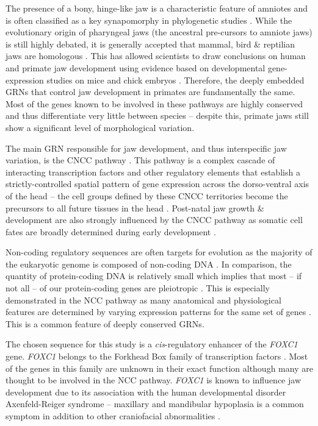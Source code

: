 \documentclass{article}[12pt]
\begin{document}
The presence of a bony, hinge-like jaw is a characteristic feature of amniotes and is often classified as a key synapomorphy in phylogenetic studies \parencite{Franchini2017}. While the evolutionary origin of pharyngeal jaws (the ancestral pre-cursors to amniote jaws) is still highly debated, it is generally accepted that mammal, bird \& reptilian jaws are homologous \parencite{Kulesa2010}. This has allowed scientists to draw conclusions on human and primate jaw development using evidence based on developmental gene-expression studies on mice and chick embryos \parencite{Huang2004, Kulesa2010, Varki2005}. Therefore, the deeply embedded \Glspl{GRN} that control jaw development in primates are fundamentally the same. Most of the genes known to be involved in these pathways are highly conserved and thus differentiate very little between species \parencite{Bird2007} – despite this, primate jaws still show a significant level of morphological variation.

The main \Gls{GRN} responsible for jaw development, and thus interspecific jaw variation, is the \Gls{CNCC} pathway \parencite{McLean2011}. This pathway is a complex cascade of interacting transcription factors and other regulatory elements that establish a strictly-controlled spatial pattern of gene expression across the dorso-ventral axis of the head – the cell groups defined by these \Gls{CNCC} territories become the precursors to all future tissues in the head \parencite{Kulesa2010}. Post-natal jaw growth \& development are also strongly influenced by the \Gls{CNCC} pathway as somatic cell fates are broadly determined during early development \parencite{Bastir2004}.

Non-coding regulatory sequences are often targets for evolution as the majority of the eukaryotic genome is composed of non-coding DNA \parencite{Franchini2017, Kostka2011, McLean2011}. In comparison, the quantity of protein-coding DNA is relatively small which implies that most – if not all – of our protein-coding genes are pleiotropic \parencite{Franchini2017, deLeon2007}. This is especially demonstrated in the \Gls{NCC} pathway as many anatomical and physiological features are determined by varying expression patterns for the same set of genes \parencite{Kulesa2010, Mayor2013}. This is a common feature of deeply conserved \Glspl{GRN}.

The chosen sequence for this study is a \emph{cis}-regulatory enhancer of the \emph{\Gls{FOXC1}} gene. \emph{FOXC1} belongs to the Forkhead Box family of transcription factors \parencite{Lander2001, Wray2007}. Most of the genes in this family are unknown in their exact function although many are thought to be involved in the \Gls{NCC} pathway. \emph{FOXC1} is known to influence jaw development due to its association with the human developmental disorder Axenfeld-Reiger syndrome – maxillary and mandibular hypoplasia is a common symptom in addition to other craniofacial abnormalities \parencite{Prescott2015, Tumer2009, Yuan2019}.
\end{document}
